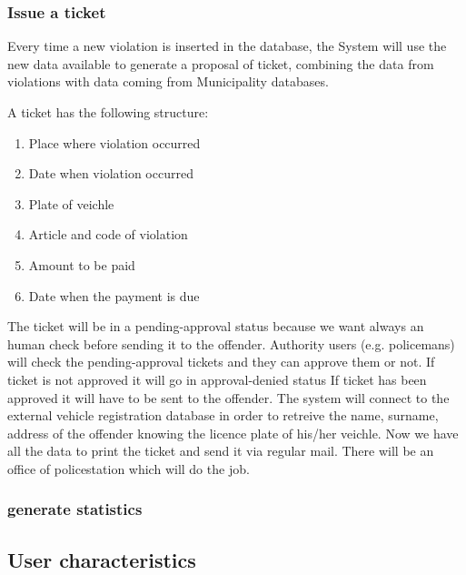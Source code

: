 \subsubsection{Issue a ticket }
Every time a new violation is inserted in the database, the System will use the new data available to generate a proposal of ticket, combining the data from violations with data coming from Municipality databases.

A ticket has the following structure:
\begin{enumerate}
  \item Place where violation occurred
  \item Date when violation occurred
  \item Plate of veichle
  \item Article and code of violation
  \item Amount to be paid
  \item Date when the payment is due
\end{enumerate}

The ticket will be in a pending-approval status because we want always an human check before sending it to the offender.
Authority users (e.g. policemans) will check the pending-approval tickets and they can approve them or not.
If ticket is not approved it will go in approval-denied status
If ticket has been approved it will have to be sent to the offender.
The system will connect to the external vehicle registration database in order to retreive the name, surname, address of the offender knowing the licence plate of his/her veichle.
Now we have all the data to print the ticket and send it via regular mail. There will be an office of policestation which will do the job.

\subsubsection{generate statistics}

\subsection{User characteristics }



